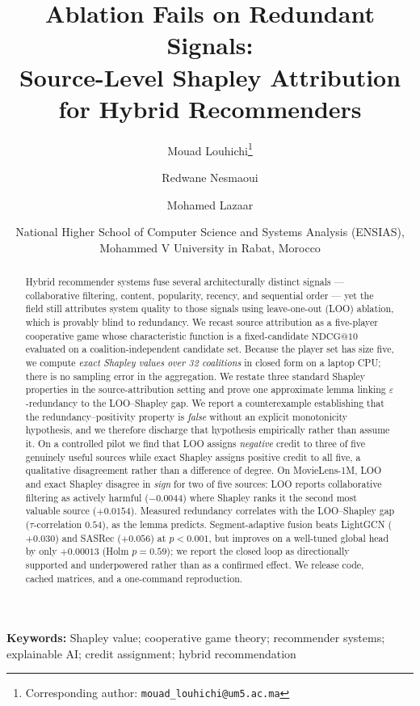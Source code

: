 \documentclass[11pt]{article}
\title{\textbf{Ablation Fails on Redundant Signals:\\
Source-Level Shapley Attribution for Hybrid Recommenders}}
\author{
  Mouad Louhichi\thanks{Corresponding author: \texttt{mouad\_louhichi@um5.ac.ma}}
  \and Redwane Nesmaoui
  \and Mohamed Lazaar
}
\date{National Higher School of Computer Science and Systems Analysis (ENSIAS),\\
Mohammed V University in Rabat, Morocco}
\makeatletter
\newcommand{\NDCG}{\mathrm{NDCG@10}}
\makeatother
\begin{document}
\maketitle

\begin{abstract}
\noindent
Hybrid recommender systems fuse several architecturally distinct signals ---
collaborative filtering, content, popularity, recency, and sequential order ---
yet the field still attributes system quality to those signals using
leave-one-out (LOO) ablation, which is provably blind to redundancy. We recast
source attribution as a five-player cooperative game whose characteristic
function is a fixed-candidate $\NDCG$ evaluated on a coalition-independent
candidate set. Because the player set has size five, we compute
\emph{exact Shapley values over 32 coalitions} in closed form on a laptop CPU;
there is no sampling error in the aggregation. We restate three standard
Shapley properties in the source-attribution setting and prove one approximate
lemma linking $\varepsilon$-redundancy to the LOO--Shapley gap. We report a
counterexample establishing that the redundancy--positivity property is
\emph{false} without an explicit monotonicity hypothesis, and we therefore
discharge that hypothesis empirically rather than assume it. On a controlled
pilot we find that LOO assigns \emph{negative} credit to three of five
genuinely useful sources while exact Shapley assigns positive credit to all
five, a qualitative disagreement rather than a difference of degree. On MovieLens-1M, LOO and exact Shapley disagree in \emph{sign} for two of five
sources: LOO reports collaborative filtering as actively harmful
($-0.0044$) where Shapley ranks it the second most valuable source
($+0.0154$). Measured redundancy correlates with the LOO--Shapley gap
($\tau$-correlation $0.54$), as the lemma predicts. Segment-adaptive fusion beats LightGCN
($+0.030$) and SASRec ($+0.056$) at $p < 0.001$, but improves on a well-tuned
global head by only $+0.00013$ (Holm $p = 0.59$); we report the closed loop as
directionally supported and underpowered rather than as a confirmed effect. We release code, cached matrices,
and a one-command reproduction.
\end{abstract}

\noindent\textbf{Keywords:} Shapley value; cooperative game theory;
recommender systems; explainable AI; credit assignment; hybrid recommendation

\bigskip
\noindent{}
\end{document}
